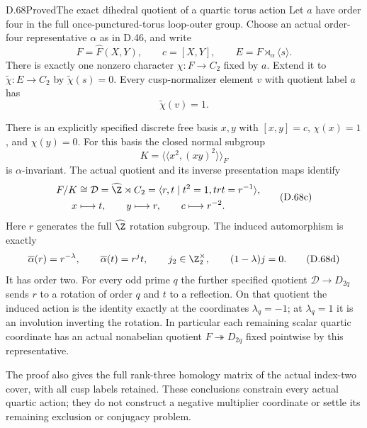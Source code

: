 \begin{claim}{D.68}{Proved}{The exact dihedral quotient of a quartic torus action}
Let $a$ have order four in the full once-punctured-torus
loop-outer group. Choose an actual order-four representative
$\alpha$ as in D.46, and write
\[
 F=\widehat F(X,Y),\qquad c=[X,Y],\qquad
 E=F\rtimes_\alpha\langle s\rangle .
\]
There is exactly one nonzero character $\chi:F\to C_2$
fixed by $a$. Extend it to $\widetilde\chi:E\to C_2$
by $\widetilde\chi(s)=0$. Every cusp-normalizer element
$v$ with quotient label $a$ has
\[
                   \widetilde\chi(v)=1.                    \tag{D.68a}
\]

There is an explicitly specified discrete free basis $x,y$
with $[x,y]=c$, $\chi(x)=1$, and $\chi(y)=0$.
For this basis the closed normal subgroup
\[
                K=\langle\!\langle x^2,(xy)^2
                           \rangle\!\rangle_F              \tag{D.68b}
\]
is $\alpha$-invariant. The actual quotient and its inverse
presentation maps identify
\[
 \begin{split}
 F/K&\cong\mathcal D=\widehat\Z\rtimes C_2
       =\langle r,t\mid t^2=1, trt=r^{-1}\rangle,\\
 x&\longmapsto t,\qquad y\longmapsto r,
                 \qquad c\longmapsto r^{-2}.
 \end{split}                                               \tag{D.68c}
\]
Here $r$ generates the full $\widehat\Z$ rotation subgroup.
The induced automorphism is exactly
\[
 \overline\alpha(r)=r^{-\lambda},\qquad
 \overline\alpha(t)=r^j t,\qquad
 j_2\in\Z_2^\times,\qquad (1-\lambda)j=0.                \tag{D.68d}
\]
It has order two. For every odd prime $q$ the further
specified quotient $\mathcal D\to D_{2q}$ sends $r$ to
a rotation of order $q$ and $t$ to a reflection.
On that quotient the induced action is the identity
exactly at the coordinates $\lambda_q=-1$; at
$\lambda_q=1$ it is an involution inverting the rotation.
In particular each remaining scalar quartic coordinate
has an actual nonabelian quotient $F\twoheadrightarrow D_{2q}$
fixed pointwise by this representative.

The proof also gives the full rank-three homology matrix
of the actual index-two cover, with all cusp labels retained.
These conclusions constrain every actual quartic action;
they do not construct a negative multiplier coordinate
or settle its remaining exclusion or conjugacy problem.
\end{claim}
